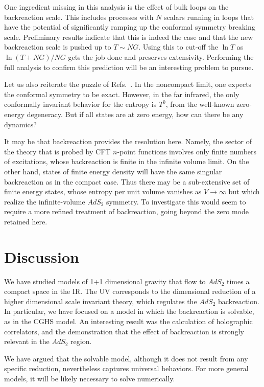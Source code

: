 \documentclass[12pt]{article}
\begin{document}
{{One ingredient missing in this analysis is the effect of bulk loops on the backreaction scale. This includes processes with $N$ scalars running in loops that have the potential of significantly ramping up the conformal symmetry breaking scale. Preliminary results \cite{loops} indicate that this is indeed the case and that the new backreaction scale is pushed up to $T \sim N G$. Using this to cut-off the $\ln T$ as $\ln(T + N G)/N G$ gets the job done and preserves extensivity. Performing the full analysis to confirm this prediction will be an interesting problem to pursue.}


Let us also reiterate the puzzle of Refs.~\cite{Jensen:2011su,Iqbal:2011in}.  In the noncompact limit, one expects the conformal symmetry to be exact.  However, in the far infrared, the only conformally invariant behavior for the entropy is $T^0$, from the well-known zero-energy degeneracy.  But if all states are at zero energy, how can there be any dynamics?  

It may be that backreaction provides the resolution here.  Namely, the sector of the theory that is probed by CFT $n$-point functions involves only finite numbers of excitations, whose backreaction is finite in the infinite volume limit.  On the other hand, states of finite energy density will have the same singular backreaction as in the compact case.  Thus there may be a sub-extensive set of finite energy states, whose entropy per unit volume vanishes as $V \to \infty$ but which realize the infinite-volume $AdS_2$ symmetry.
To investigate this would seem to require a more refined treatment of backreaction, going beyond the zero mode retained here.

\section{Discussion}

We have studied models of 1+1 dimensional gravity that flow to $AdS_2$ times a compact space in the IR.  The UV corresponds to the dimensional reduction of a higher dimensional scale invariant theory, which regulates the $AdS_2$ backreaction.  In particular, we have focused on a model in which the backreaction is solvable, as in the CGHS model.  An interesting result was  the calculation of holographic correlators, and the demonstration that the effect of backreaction is strongly relevant in the $AdS_2$ region.  

We have argued that the solvable model, although it does not result from any specific reduction, nevertheless captures universal behaviors.  For more general models, it will be likely necessary to solve numerically. 

}
\end{document}
